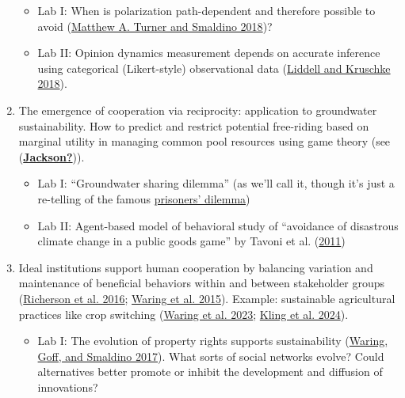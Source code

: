 \documentclass[letterpaper]{article}
\providecommand{\tightlist}{%
  \setlength{\itemsep}{0pt}\setlength{\parskip}{0pt}}
\begin{document}
\begin{enumerate}
  \begin{itemize}
  \tightlist
  \item
    Lab I: When is polarization path-dependent and therefore possible to
    avoid {(\hyperref[ref-Turner2018]{Matthew A. Turner and Smaldino
    2018})}?
  \item
    Lab II: Opinion dynamics measurement depends on accurate inference
    using categorical (Likert-style) observational data
    {(\hyperref[ref-Liddell2018]{Liddell and Kruschke 2018})}.
  \end{itemize}
\item
  The emergence of cooperation via reciprocity: application to
  groundwater sustainability. How to predict and restrict potential
  free-riding based on marginal utility in managing common pool
  resources using game theory (see
  {(\hyperref[ref-Jackson]{\textbf{Jackson?}})}).

  \begin{itemize}
  \tightlist
  \item
    Lab I: ``Groundwater sharing dilemma'' (as we'll call it, though
    it's just a re-telling of the famous
    \href{https://en.wikipedia.org/wiki/Prisoner\%27s_dilemma}{prisoners'
    dilemma})
  \item
    Lab II: Agent-based model of behavioral study of ``avoidance of
    disastrous climate change in a public goods game'' by {Tavoni et al.
    (\hyperref[ref-Tavoni2011]{2011})}
  \end{itemize}
\item
  Ideal institutions support human cooperation by balancing variation
  and maintenance of beneficial behaviors within and between stakeholder
  groups {(\hyperref[ref-Richerson2016d]{Richerson et al. 2016};
  \hyperref[ref-Waring2015]{Waring et al. 2015})}. Example: sustainable
  agricultural practices like crop switching
  {(\hyperref[ref-Waring2023]{Waring et al. 2023};
  \hyperref[ref-Kling2024]{Kling et al. 2024})}.

  \begin{itemize}
  \tightlist
  \item
    Lab I: The evolution of property rights supports sustainability
    {(\hyperref[ref-Waring2017]{Waring, Goff, and Smaldino 2017})}. What
    sorts of social networks evolve? Could alternatives better promote
    or inhibit the development and diffusion of innovations?
  \end{itemize}
\end{enumerate}

\label{quarto-appendix}
\label{quarto-bibliography}
\end{document}
